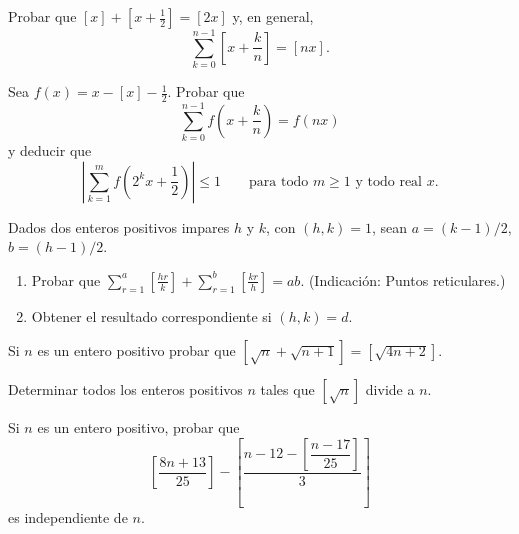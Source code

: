 \documentclass[12pt,a4paper]{book}
\begin{document}
    \begin{ejercicio}
        Probar que $[x]+[x+\tfrac{1}{2}]=[2x]$ y, en general,
        \begin{equation*}
            \sum_{k=0}^{n-1}\left[x+\frac{k}{n}\right]=[nx].
        \end{equation*}
    \end{ejercicio}

    \begin{ejercicio}
        Sea $f(x)=x-[x]-\tfrac{1}{2}$. Probar que
        \begin{equation*}
            \sum_{k=0}^{n-1}f\left(x+\frac{k}{n}\right)=f(nx)
        \end{equation*}
        y deducir que
        \begin{equation*}
            \left|\sum_{k=1}^{m}f\left(2^{k}x+\frac{1}{2}\right)\right|\leq1
            \qquad\text{para todo } m\geq1 \text{ y todo real } x.
        \end{equation*}
    \end{ejercicio}

    \begin{ejercicio}
        Dados dos enteros positivos impares $h$ y $k$, con $(h,k)=1$, sean $a=(k-1)/2$,
        $b=(h-1)/2$.
        \begin{enumerate}
            \item[(a)] Probar que
            $\displaystyle\sum_{r=1}^{a}\left[\frac{hr}{k}\right]
            +\sum_{r=1}^{b}\left[\frac{kr}{h}\right]=ab$. (Indicación: Puntos
            reticulares.)
            \item[(b)] Obtener el resultado correspondiente si $(h,k)=d$.
        \end{enumerate}
    \end{ejercicio}

    \begin{ejercicio}
        Si $n$ es un entero positivo probar que $[\sqrt{n}+\sqrt{n+1}]=[\sqrt{4n+2}]$.
    \end{ejercicio}

    \begin{ejercicio}
        Determinar todos los enteros positivos $n$ tales que $[\sqrt{n}]$ divide a $n$.
    \end{ejercicio}

    \begin{ejercicio}
        Si $n$ es un entero positivo, probar que
        \begin{equation*}
            \left[\frac{8n+13}{25}\right]-\left[\frac{n-12-\left[\dfrac{n-17}{25}\right]}{3}\right]
        \end{equation*}
        es independiente de $n$.
    \end{ejercicio}
\end{document}
